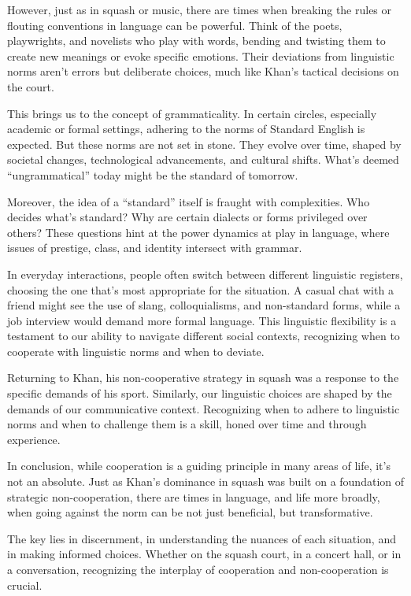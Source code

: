 However, just as in squash or music, there are times when breaking the rules or flouting conventions in language can be powerful. Think of the poets, playwrights, and novelists who play with words, bending and twisting them to create new meanings or evoke specific emotions. Their deviations from linguistic norms aren't errors but deliberate choices, much like Khan's tactical decisions on the court.

This brings us to the concept of grammaticality. In certain circles, especially academic or formal settings, adhering to the norms of Standard English is expected. But these norms are not set in stone. They evolve over time, shaped by societal changes, technological advancements, and cultural shifts. What's deemed ``ungrammatical'' today might be the standard of tomorrow.

Moreover, the idea of a ``standard'' itself is fraught with complexities. Who decides what's standard? Why are certain dialects or forms privileged over others? These questions hint at the power dynamics at play in language, where issues of prestige, class, and identity intersect with grammar.

In everyday interactions, people often switch between different linguistic registers, choosing the one that's most appropriate for the situation. A casual chat with a friend might see the use of slang, colloquialisms, and non-standard forms, while a job interview would demand more formal language. This linguistic flexibility is a testament to our ability to navigate different social contexts, recognizing when to cooperate with linguistic norms and when to deviate.

Returning to Khan, his non-cooperative strategy in squash was a response to the specific demands of his sport. Similarly, our linguistic choices are shaped by the demands of our communicative context. Recognizing when to adhere to linguistic norms and when to challenge them is a skill, honed over time and through experience.

In conclusion, while cooperation is a guiding principle in many areas of life, it's not an absolute. Just as Khan's dominance in squash was built on a foundation of strategic non-cooperation, there are times in language, and life more broadly, when going against the norm can be not just beneficial, but transformative.

The key lies in discernment, in understanding the nuances of each situation, and in making informed choices. Whether on the squash court, in a concert hall, or in a conversation, recognizing the interplay of cooperation and non-cooperation is crucial.

